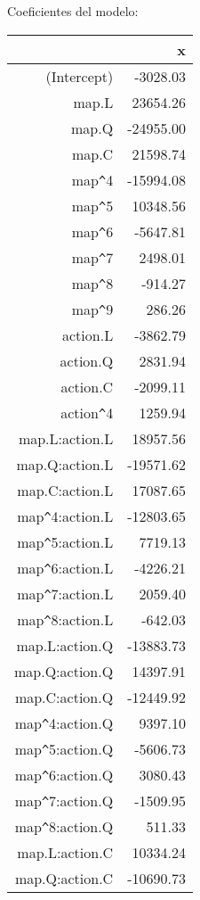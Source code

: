 \documentclass[10pt,a4paper]{article}
\begin{document}
Coeficientes del modelo:
\begin{table}[ht]
\centering
\begin{tabular}{rr}
  \hline
 & x \\ 
  \hline
(Intercept) & -3028.03 \\ 
  map.L & 23654.26 \\ 
  map.Q & -24955.00 \\ 
  map.C & 21598.74 \\ 
  map\verb|^|4 & -15994.08 \\ 
  map\verb|^|5 & 10348.56 \\ 
  map\verb|^|6 & -5647.81 \\ 
  map\verb|^|7 & 2498.01 \\ 
  map\verb|^|8 & -914.27 \\ 
  map\verb|^|9 & 286.26 \\ 
  action.L & -3862.79 \\ 
  action.Q & 2831.94 \\ 
  action.C & -2099.11 \\ 
  action\verb|^|4 & 1259.94 \\ 
  map.L:action.L & 18957.56 \\ 
  map.Q:action.L & -19571.62 \\ 
  map.C:action.L & 17087.65 \\ 
  map\verb|^|4:action.L & -12803.65 \\ 
  map\verb|^|5:action.L & 7719.13 \\ 
  map\verb|^|6:action.L & -4226.21 \\ 
  map\verb|^|7:action.L & 2059.40 \\ 
  map\verb|^|8:action.L & -642.03 \\ 
  map.L:action.Q & -13883.73 \\ 
  map.Q:action.Q & 14397.91 \\ 
  map.C:action.Q & -12449.92 \\ 
  map\verb|^|4:action.Q & 9397.10 \\ 
  map\verb|^|5:action.Q & -5606.73 \\ 
  map\verb|^|6:action.Q & 3080.43 \\ 
  map\verb|^|7:action.Q & -1509.95 \\ 
  map\verb|^|8:action.Q & 511.33 \\ 
  map.L:action.C & 10334.24 \\ 
  map.Q:action.C & -10690.73 \\ 

\end{tabular}
\end{table}
\end{document}

